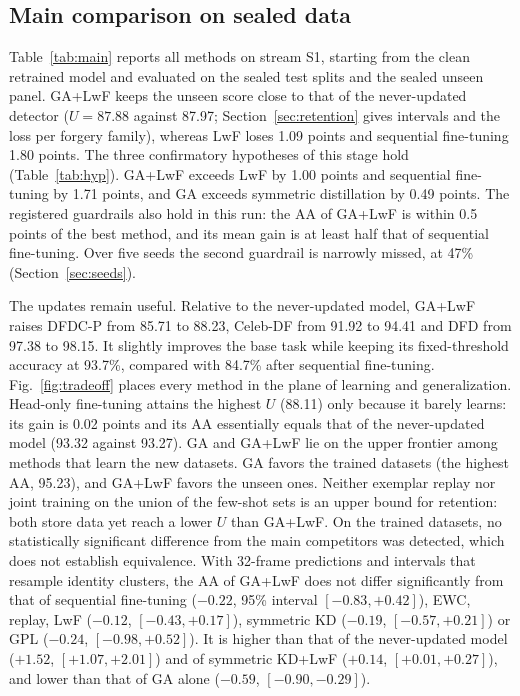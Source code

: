 \documentclass{ieeeaccess}
\begin{document}
\subsection{Main comparison on sealed data}
Table~\ref{tab:main} reports all methods on stream S1, starting from the clean retrained model and evaluated on the sealed test splits and the sealed unseen panel. GA+LwF keeps the unseen score close to that of the never-updated detector ($U=87.88$ against 87.97; Section~\ref{sec:retention} gives intervals and the loss per forgery family), whereas LwF loses 1.09 points and sequential fine-tuning 1.80 points. The three confirmatory hypotheses of this stage hold (Table~\ref{tab:hyp}). GA+LwF exceeds LwF by 1.00 points and sequential fine-tuning by 1.71 points, and GA exceeds symmetric distillation by 0.49 points. The registered guardrails also hold in this run: the AA of GA+LwF is within 0.5 points of the best method, and its mean gain is at least half that of sequential fine-tuning. Over five seeds the second guardrail is narrowly missed, at 47\% (Section~\ref{sec:seeds}).

The updates remain useful. Relative to the never-updated model, GA+LwF raises DFDC-P from 85.71 to 88.23, Celeb-DF from 91.92 to 94.41 and DFD from 97.38 to 98.15. It slightly improves the base task while keeping its fixed-threshold accuracy at 93.7\%, compared with 84.7\% after sequential fine-tuning. Fig.~\ref{fig:tradeoff} places every method in the plane of learning and generalization. Head-only fine-tuning attains the highest $U$ (88.11) only because it barely learns: its gain is 0.02 points and its AA essentially equals that of the never-updated model (93.32 against 93.27). GA and GA+LwF lie on the upper frontier among methods that learn the new datasets. GA favors the trained datasets (the highest AA, 95.23), and GA+LwF favors the unseen ones. Neither exemplar replay nor joint training on the union of the few-shot sets is an upper bound for retention: both store data yet reach a lower $U$ than GA+LwF. On the trained datasets, no statistically significant difference from the main competitors was detected, which does not establish equivalence. With 32-frame predictions and intervals that resample identity clusters, the AA of GA+LwF does not differ significantly from that of sequential fine-tuning ($-0.22$, 95\% interval $[-0.83,+0.42]$), EWC, replay, LwF ($-0.12$, $[-0.43,+0.17]$), symmetric KD ($-0.19$, $[-0.57,+0.21]$) or GPL ($-0.24$, $[-0.98,+0.52]$). It is higher than that of the never-updated model ($+1.52$, $[+1.07,+2.01]$) and of symmetric KD+LwF ($+0.14$, $[+0.01,+0.27]$), and lower than that of GA alone ($-0.59$, $[-0.90,-0.29]$).
\end{document}
